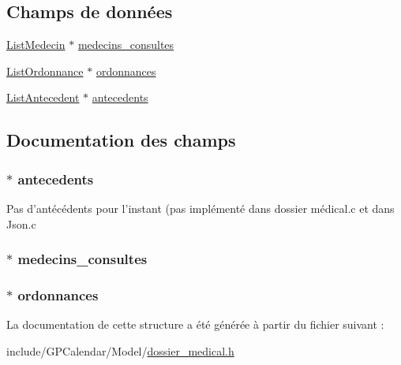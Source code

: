 \subsection*{Champs de données}
\begin{DoxyCompactItemize}
\item 
\hyperlink{struct_list_medecin}{List\-Medecin} $\ast$ \hyperlink{struct_dossier_medical_a7f90f000e882b02f6ce24bbef6ce32f0}{medecins\-\_\-consultes}
\item 
\hyperlink{struct_list_ordonnance}{List\-Ordonnance} $\ast$ \hyperlink{struct_dossier_medical_ac4e1845527931ccc76c5ab1c1241d0e1}{ordonnances}
\item 
\hyperlink{struct_list_antecedent}{List\-Antecedent} $\ast$ \hyperlink{struct_dossier_medical_a63a3ed7e25a889fb251e7de019a7d63c}{antecedents}
\end{DoxyCompactItemize}


\subsection{Documentation des champs}
\hypertarget{struct_dossier_medical_a63a3ed7e25a889fb251e7de019a7d63c}{
\subsubsection[{antecedents}]{$\ast$ antecedents}}\label{struct_dossier_medical_a63a3ed7e25a889fb251e7de019a7d63c}
Pas d'antécédents pour l'instant (pas implémenté dans dossier médical.\-c et dans Json.\-c \hypertarget{struct_dossier_medical_a7f90f000e882b02f6ce24bbef6ce32f0}{
\subsubsection[{medecins\-\_\-consultes}]{$\ast$ medecins\-\_\-consultes}}\label{struct_dossier_medical_a7f90f000e882b02f6ce24bbef6ce32f0}
\hypertarget{struct_dossier_medical_ac4e1845527931ccc76c5ab1c1241d0e1}{
\subsubsection[{ordonnances}]{$\ast$ ordonnances}}\label{struct_dossier_medical_ac4e1845527931ccc76c5ab1c1241d0e1}


La documentation de cette structure a été générée à partir du fichier suivant \-:\begin{DoxyCompactItemize}
\item 
include/\-G\-P\-Calendar/\-Model/\hyperlink{dossier__medical_8h}{dossier\-\_\-medical.\-h}\end{DoxyCompactItemize}
